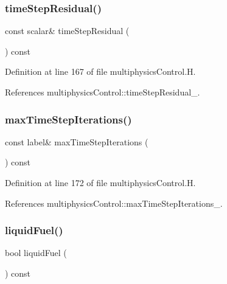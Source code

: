 \subsubsection{\texorpdfstring{time\+Step\+Residual()}{timeStepResidual()}}
{\footnotesize\ttfamily const scalar\& time\+Step\+Residual (\begin{DoxyParamCaption}{ }\end{DoxyParamCaption}) const\hspace{0.3cm}{\ttfamily [inline]}}



Definition at line 167 of file multiphysics\+Control.\+H.



References multiphysics\+Control\+::time\+Step\+Residual\+\_\+.

\mbox{\label{classFoam_1_1multiphysicsControl_a528b923003af65d04bd5b33e3069e057}} 
\subsubsection{\texorpdfstring{max\+Time\+Step\+Iterations()}{maxTimeStepIterations()}}
{\footnotesize\ttfamily const label\& max\+Time\+Step\+Iterations (\begin{DoxyParamCaption}{ }\end{DoxyParamCaption}) const\hspace{0.3cm}{\ttfamily [inline]}}



Definition at line 172 of file multiphysics\+Control.\+H.



References multiphysics\+Control\+::max\+Time\+Step\+Iterations\+\_\+.

\mbox{\label{classFoam_1_1multiphysicsControl_acdbd914add6a8c8c9a09276fa003206e}} 
\subsubsection{\texorpdfstring{liquid\+Fuel()}{liquidFuel()}}
{\footnotesize\ttfamily bool liquid\+Fuel (\begin{DoxyParamCaption}{ }\end{DoxyParamCaption}) const\hspace{0.3cm}{\ttfamily [inline]}}



